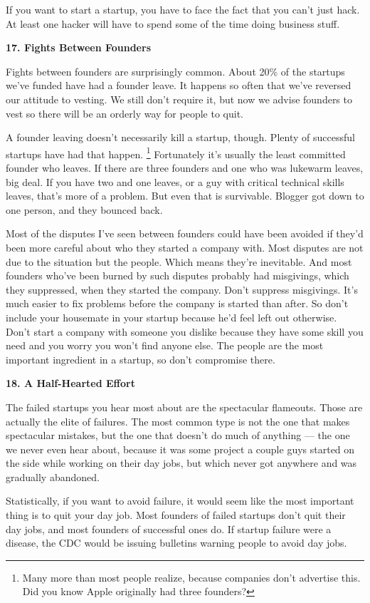 \documentclass[12pt]{book}
\begin{document}
If you want to start a startup, you have to face the fact that you can't
just hack. At least one hacker will have to spend some of the time doing
business stuff.

\textbf{17. Fights Between Founders}

Fights between founders are surprisingly common. About 20\% of the
startups we've funded have had a founder leave. It happens so often that
we've reversed our attitude to vesting. We still don't require it, but
now we advise founders to vest so there will be an orderly way for
people to quit.

A founder leaving doesn't necessarily kill a startup, though. Plenty of
successful startups have had that happen. \footnote{Many more than most people realize, because companies don't
advertise this. Did you know Apple originally had three founders?}
Fortunately it's usually the least committed founder who leaves. If
there are three founders and one who was lukewarm leaves, big deal. If
you have two and one leaves, or a guy with critical technical skills
leaves, that's more of a problem. But even that is survivable. Blogger
got down to one person, and they bounced back.

Most of the disputes I've seen between founders could have been avoided
if they'd been more careful about who they started a company with. Most
disputes are not due to the situation but the people. Which means
they're inevitable. And most founders who've been burned by such
disputes probably had misgivings, which they suppressed, when they
started the company. Don't suppress misgivings. It's much easier to fix
problems before the company is started than after. So don't include your
housemate in your startup because he'd feel left out otherwise. Don't
start a company with someone you dislike because they have some skill
you need and you worry you won't find anyone else. The people are the
most important ingredient in a startup, so don't compromise there.

\textbf{18. A Half-Hearted Effort}

The failed startups you hear most about are the spectacular flameouts.
Those are actually the elite of failures. The most common type is not
the one that makes spectacular mistakes, but the one that doesn't do
much of anything --- the one we never even hear about, because it was
some project a couple guys started on the side while working on their
day jobs, but which never got anywhere and was gradually abandoned.

Statistically, if you want to avoid failure, it would seem like the most
important thing is to quit your day job. Most founders of failed
startups don't quit their day jobs, and most founders of successful ones
do. If startup failure were a disease, the CDC would be issuing
bulletins warning people to avoid day jobs.
\end{document}
